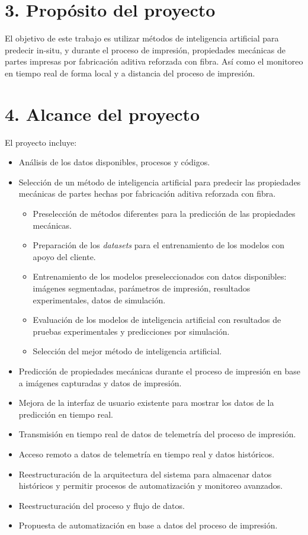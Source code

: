 \documentclass[
11pt, %
]{charter}
\begin{document}
\section{3. Propósito del proyecto}
\label{sec:proposito}

El objetivo de este trabajo es utilizar métodos de inteligencia artificial para predecir in-situ, y durante el proceso de impresión, propiedades mecánicas de partes impresas por fabricación aditiva reforzada con fibra. Así como el monitoreo en tiempo real de forma local y a distancia del proceso de impresión. 


\section{4. Alcance del proyecto}
\label{sec:alcance}

El proyecto incluye:
\begin{itemize}
	\item Análisis de los datos disponibles, procesos y códigos.
	\item Selección de un método de inteligencia artificial para predecir las propiedades mecánicas de partes hechas por fabricación aditiva reforzada con fibra.
		\begin{itemize}
		\item Preselección de métodos diferentes para la predicción de las propiedades mecánicas.
        \item Preparación de los \textit{datasets} para el entrenamiento de los modelos con apoyo del cliente.
		\item Entrenamiento de los modelos preseleccionados con datos disponibles: imágenes segmentadas, parámetros de impresión, resultados experimentales, datos de simulación.
		\item Evaluación de los modelos de inteligencia artificial con resultados de pruebas experimentales y predicciones por simulación.
        \item Selección del mejor método de inteligencia artificial.
		\end{itemize}
    \item Predicción de propiedades mecánicas durante el proceso de impresión en base a imágenes capturadas y datos de impresión.
	\item Mejora de la interfaz de usuario existente para mostrar los datos de la predicción en tiempo real.
    \item Transmisión en tiempo real de datos de telemetría del proceso de impresión.
    \item Acceso remoto a datos de telemetría en tiempo real y datos históricos.
    \item Reestructuración de la arquitectura del sistema para almacenar datos históricos y permitir procesos de automatización y monitoreo avanzados.
    \item Reestructuración del proceso y flujo de datos.
    \item Propuesta de automatización en base a datos del proceso de impresión.
	
\end{itemize}
\end{document}
